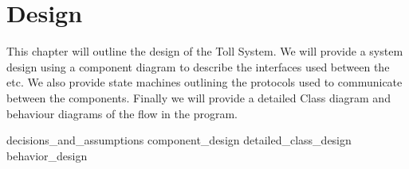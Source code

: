\chapter{Design}
This chapter will outline the design of the Toll System. We will provide a system design using a component diagram to describe the interfaces used between the etc. We also provide state machines outlining the protocols used to communicate between the components. Finally we will provide a detailed Class diagram and behaviour diagrams of the flow in the program.

{decisions_and_assumptions}
{component_design}
{detailed_class_design}
{behavior_design}
